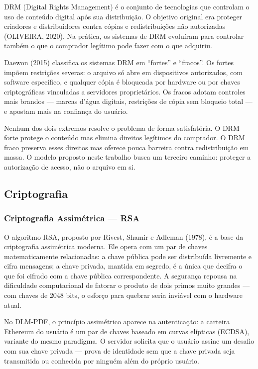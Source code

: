 \documentclass[12pt]{article}
\begin{document}
DRM (Digital Rights Management) é o conjunto de tecnologias que controlam o uso de conteúdo digital após sua distribuição. O objetivo original era proteger criadores e distribuidores contra cópias e redistribuições não autorizadas (OLIVEIRA, 2020). Na prática, os sistemas de DRM evoluíram para controlar também o que o comprador legítimo pode fazer com o que adquiriu.

Daewon (2015) classifica os sistemas DRM em ``fortes'' e ``fracos''. Os fortes impõem restrições severas: o arquivo só abre em dispositivos autorizados, com software específico, e qualquer cópia é bloqueada por hardware ou por chaves criptográficas vinculadas a servidores proprietários. Os fracos adotam controles mais brandos — marcas d'água digitais, restrições de cópia sem bloqueio total — e apostam mais na confiança do usuário.

Nenhum dos dois extremos resolve o problema de forma satisfatória. O DRM forte protege o conteúdo mas elimina direitos legítimos do comprador. O DRM fraco preserva esses direitos mas oferece pouca barreira contra redistribuição em massa. O modelo proposto neste trabalho busca um terceiro caminho: proteger a autorização de acesso, não o arquivo em si.

\subsection{Criptografia}

\subsubsection*{Criptografia Assimétrica — RSA}

O algoritmo RSA, proposto por Rivest, Shamir e Adleman (1978), é a base da criptografia assimétrica moderna. Ele opera com um par de chaves matematicamente relacionadas: a chave pública pode ser distribuída livremente e cifra mensagens; a chave privada, mantida em segredo, é a única que decifra o que foi cifrado com a chave pública correspondente. A segurança repousa na dificuldade computacional de fatorar o produto de dois primos muito grandes — com chaves de 2048 bits, o esforço para quebrar seria inviável com o hardware atual.

No DLM-PDF, o princípio assimétrico aparece na autenticação: a carteira Ethereum do usuário é um par de chaves baseado em curvas elípticas (ECDSA), variante do mesmo paradigma. O servidor solicita que o usuário assine um desafio com sua chave privada — prova de identidade sem que a chave privada seja transmitida ou conhecida por ninguém além do próprio usuário.
\end{document}
